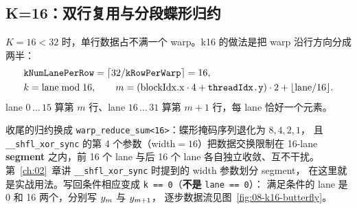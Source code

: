 \subsection{K=16：双行复用与分段蝶形归约}

$K = 16 < 32$ 时，单行数据占不满一个 warp。k16 的做法是把 warp 沿行方向分成两半：
\begin{equation}
\begin{aligned}
  &\texttt{k\allowbreak{}Num\allowbreak{}Lane\allowbreak{}Per\allowbreak{}Row} = \lceil 32 / \texttt{kRowPerWarp} \rceil = 16, \\
  &k = \mathrm{lane} \bmod 16, \qquad
  m = (\mathrm{blockIdx.x} \cdot 4 + \texttt{threadIdx.y}) \cdot 2 + \lfloor \mathrm{lane} / 16 \rfloor .
\end{aligned}
\label{eq:8-k16-map}
\end{equation}
lane $0\,\dots\,15$ 算第 $m$ 行、lane $16\,\dots\,31$ 算第 $m+1$ 行，每 lane 恰好一个元素。

收尾的归约换成 \texttt{warp\_\allowbreak{}reduce\_\allowbreak{}sum\allowbreak{}<16>}：蝶形掩码序列退化为 $8, 4, 2, 1$，
且 \texttt{\_\allowbreak{}\_\allowbreak{}shfl\_\allowbreak{}xor\_\allowbreak{}sync} 的第 4 个参数（width$=16$）把数据交换限制在
16-lane \textbf{segment} 之内，前 16 个 lane 与后 16 个 lane 各自独立收敛、互不干扰。
第~\ref{ch:02}~章讲 \texttt{\_\allowbreak{}\_\allowbreak{}shfl\_\allowbreak{}xor\_\allowbreak{}sync} 时提到的 width 参数划分 segment，
在这里就是实战用法。写回条件相应变成 \texttt{k == 0}（\textbf{不是} \texttt{lane == 0}）：
满足条件的 lane 是 0 和 16 两个，分别写 $y\sb{m}$ 与 $y\sb{m+1}$，
逐步数据流见图~\ref{fig:08-k16-butterfly}。

